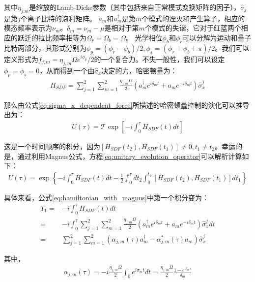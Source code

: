 其中$\eta_{j.m}$是缩放的Lamb-Dicke参数（其中包括来自正常模式变换矩阵的因子）\cite[]{James_1998}，$\hat{\sigma}_j$是第$j$个离子比特的泡利矩阵。
$a_m$和$a_m^\dagger$是第$m$个模式的湮灭和产生算子，相应的模态频率表示为$\nu_m$。$\delta_m=\nu_m-\mu$是相对于第$m$个模式的失谐，它对于红蓝两个相应的跃迁的拉比频率相等为$\Omega_r=\Omega_b=\Omega$。
光学相位$\phi_b$和$\phi_r$可以分解为运动和量子比特两部分，其形式分别为$\phi_p=(\phi_r-\phi_b)/2, \phi_s=(\phi_r+\phi_b+\pi)/2$。我们可以定义形式为$f_{j,m}=\eta_{j,m}\Omega e^{i\phi_p}/2$的一个复合力。不失一般性，我们可以设定$\phi_p=\phi_s=0$，从而得到一个由$\hat{\sigma}_x$决定的力，哈密顿量为：
\begin{align}
    H_{SDF}=\sum_{j=1}^{2}\sum_{m=1}^{2}\frac{\eta_{j, m}\Omega}{2}\left(a_m^\dagger e^{i\delta_mt}+a_m e^{-i\delta_mt}\right)\hat{\sigma}_x^j\label{eq:sigma_x_dependent_force}
\end{align}

那么由公式\eqref{eq:sigma_x_dependent_force}所描述的哈密顿量控制的演化可以推导出为：
\begin{align}
    U(\tau)=\mathscr{T}\exp\left[-i\int_{0}^{\tau}H_{SDF}(t)dt\right]\label{eq:unitary_evolution_operator}
\end{align}

这是一个时间顺序的积分，因为$[H_{SDF}(t_2),H_{SDF}(t_1)]\neq 0, t_1\neq t_2$。幸运的是，通过利用Magnus公式，方程\eqref{eq:unitary_evolution_operator}可以解析计算如下\cite[]{Lee_Brickman_Deslauriers_Haljan_Duan_Monroe_2005}：
\begin{align}
    U(\tau)=\exp\left\{-i\int_{0}^{\tau}H_{SDF}(t)dt-\frac{1}{2}\int_{0}^{\tau}dt_2\int_{0}^{t_2}[H_{SDF}(t_2),H_{SDF}(t_1)]dt_1\right\}\label{eq:hamiltonian_with_magnus}
\end{align}

具体来看，公式\eqref{eq:hamiltonian_with_magnus}中第一个积分变为：
\begin{align}
    T_1=&-i\int_{0}^{\tau}H_{SDF}(t)dt\\
    =&-i\int_{0}^{\tau}\sum_{j=1}^{2}\sum_{m=1}^{2}\frac{\eta_{j,m}\Omega}{2}\left(a_m^\dagger e^{i\delta_mt}+a_m e^{-i\delta_mt}\right)\hat{\sigma}_x^j dt\\
    =&\sum_{j=1}^{2}\sum_{m=1}^{2}\left(\alpha_{j,m}(\tau)a_m^\dagger-\alpha_{j,m}^*(\tau)a_m\right)\hat{\sigma}_x^j\label{eq:integral_t1}
\end{align}

其中，
\begin{align}
    \alpha_{j,m}(\tau)=-i\frac{\eta_{j,m}\Omega}{2}\int_{0}^{\tau}e^{i\sigma_m t}dt=\frac{\eta_{j,m}\Omega}{2}\frac{1-e^{i\delta_m\tau}}{\delta_m}\label{eq:alpha_j_m}
\end{align}

